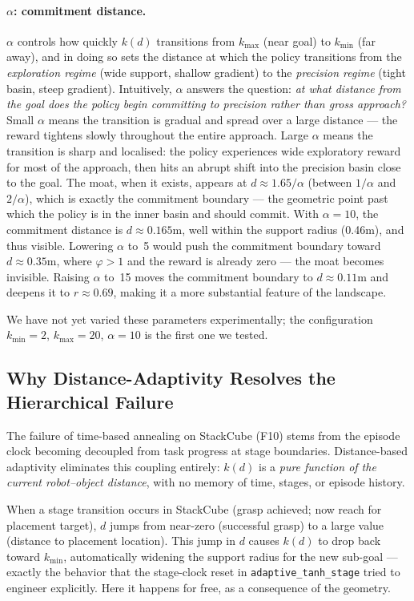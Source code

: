 \documentclass{article}
\begin{document}
\paragraph{$\alpha$: commitment distance.}
$\alpha$ controls how quickly $k(d)$ transitions from $k_{\max}$ (near goal) to
$k_{\min}$ (far away), and in doing so sets the distance at which the policy transitions
from the \emph{exploration regime} (wide support, shallow gradient) to the
\emph{precision regime} (tight basin, steep gradient). Intuitively, $\alpha$ answers
the question: \emph{at what distance from the goal does the policy begin committing to
precision rather than gross approach?} Small $\alpha$ means the transition is gradual
and spread over a large distance --- the reward tightens slowly throughout the entire
approach. Large $\alpha$ means the transition is sharp and localised: the policy
experiences wide exploratory reward for most of the approach, then hits an abrupt
shift into the precision basin close to the goal.
The moat, when it exists, appears at $d \approx 1.65/\alpha$
(between $1/\alpha$ and $2/\alpha$), which is exactly the commitment boundary ---
the geometric point past which the policy is in the inner basin and should commit.
With $\alpha=10$, the commitment distance is $d\approx 0.165$m, well within the support radius (0.46m), and thus visible.
Lowering $\alpha$ to~5 would push the commitment boundary toward $d\approx 0.35$m, where
$\varphi > 1$ and the reward is already zero --- the moat becomes invisible.
Raising $\alpha$ to~15 moves the commitment boundary to $d\approx 0.11$m and deepens it to $r\approx 0.69$,
making it a more substantial feature of the landscape.

We have not yet varied these parameters experimentally; the configuration
$k_{\min}=2$, $k_{\max}=20$, $\alpha=10$ is the first one we tested.

\subsection{Why Distance-Adaptivity Resolves the Hierarchical Failure}

The failure of time-based annealing on StackCube (F10) stems from the episode clock
becoming decoupled from task progress at stage boundaries. Distance-based adaptivity
eliminates this coupling entirely: $k(d)$ is a \emph{pure function of the current
robot--object distance}, with no memory of time, stages, or episode history.

When a stage transition occurs in StackCube (grasp achieved; now reach for placement
target), $d$ jumps from near-zero (successful grasp) to a large value (distance to
placement location). This jump in $d$ causes $k(d)$ to drop back toward $k_{\min}$,
automatically widening the support radius for the new sub-goal --- exactly the behavior
that the stage-clock reset in \texttt{adaptive\_tanh\_stage} tried to engineer
explicitly. Here it happens for free, as a consequence of the geometry.
\end{document}
